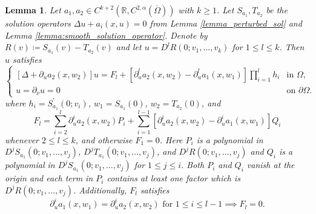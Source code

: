 \documentclass[11pt,a4paper]{amsart}
\newtheorem{Lemma}[Theorem]{Lemma}
\theoremstyle{definition}
\numberwithin{equation}{section}
\newcommand{\ol}[1]{\overline{#1}}
\begin{document}
\begin{Lemma}\label{lemma:inductive_higher_linearization}
Let \( a_{1},a_{2} \in C^{k+2}(\mathbb{R},C^{2,\alpha}(\ol{\Omega}))\) with $k\geq 1$.
Let \( S_{a_{1}},T_{a_2} \) be the solution operators \( \Delta u + a_{i}(x,u)=0 \) from Lemma \ref{lemma_perturbed_sol} and Lemma \ref{lemma:smooth_solution_operator}.
Denote by \( R(v)\coloneqq S_{a_{1}}(v)-T_{a_{2}}(v) \) and let \( u = D^{l}R(0; v_{1},\ldots, v_{k}) \) for \( 1 \leq l \leq k \).
Then \( u \) satisfies
\begin{equation}\label{eq-inductive_higher_linearization_new_1}
\begin{cases}
	[\Delta + \partial_{u}a_{2}(x,w_{2})]u = F_{l} + [\partial_{u}^{l}a_{2}(x,w_{2})-\partial_{u}^{l}a_{1}(x,w_{1})]\prod_{i=1}^{l}h_{i}&\text{in }\Omega, \\
	u = \partial_{\nu}u = 0&\text{on }\partial\Omega.
\end{cases}
\end{equation}
where \( h_{i} = S_{a_{1}}^{\prime}(0;v_{i}) \), \( w_{1} = S_{a_{1}}(0) \), \( w_{2} = T_{a_{2}}(0) \), and
\begin{equation*}
	F_{l} = \sum_{i=2}^{l}\partial_{u}^{i}a_{2}(x,w_{2})P_{i}+\sum_{i=1}^{l-	1}[\partial_{u}^{i}a_{2}(x,w_{2})-\partial_{u}^{i}a_{1}(x,w_{1})]Q_{i}
\end{equation*}
whenever $2\leq l\leq k$, and otherwise $F_1 = 0$.
Here \( P_{i} \) is a polynomial in \( D^{j}S_{a_{1}}(0;v_{1},\ldots, v_{j}) \), \( D^{j}T_{a_{1}}(0;v_{1},\ldots, v_{j}) \), and \( D^{j}R(0;v_{1},\ldots, v_{j}) \) and \( Q_{i} \) is a polynomial in \( D^{j}S_{a_{1}}(0;v_{1},\ldots, v_{j}) \) for \( 1\leq j\leq i \).
Both \( P_{i} \) and \( Q_{i} \) vanish at the origin and each term in \( P_{i} \) contains at least one factor which is \( D^{j}R(0;v_{1},\ldots,v_{j}) \).
Additionally, \( F_{l} \) satisfies
\begin{equation}\label{eq-inductive_higher_linearization_new_2}
	\partial_{u}^{i}a_{1}(x,w_{1}) = \partial_{u}^{i}a_{2}(x,w_{2})\text{ for }1\leq i\leq l-1\implies F_{l} = 0.
\end{equation}
\end{Lemma}
\end{document}
